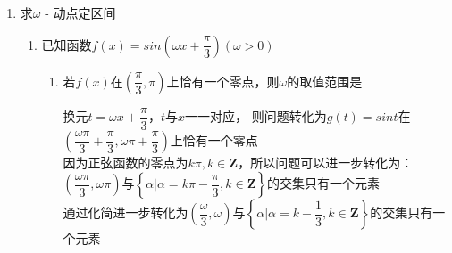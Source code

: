 \begin{enumerate}
\begin{enumerate}
\begin{jieda}
            当$k = 0$时，结合$\omega > 0$可得$\omega \in \left(0, \dfrac{\pi}{12}\right]$，当$k \neq 0$时解集为$\varnothing$，因此$\omega \in \left(0, \dfrac{\pi}{12}\right]$
        \end{jieda}
    \item 已知函数$y = cos\left(\omega x + \dfrac{\pi}{3}\right)$（$\omega > 0$）在区间$\left(-\dfrac{\pi}{6}, \dfrac{\pi}{3}\right)$上单调递减，则$\omega$的取值范围是\blkda{$\left(0, 2\right]$ }
    \begin{jieda}
        $\left(-\dfrac{\omega\pi}{6}+\dfrac{\pi}{3}, \dfrac{\omega\pi}{3}+\dfrac{\pi}{3}\right) \subset \left[2k\pi, 2k\pi+\pi\right], k\in \mathbf{Z}$，故$\omega \leq 2$
    \end{jieda}
    \item 已知函数 $f\left( x\right)  = \sin \left( {{\omega x} - \dfrac{\pi }{6}}\right) \left( {\omega  > 0}\right)$ 在 $\left\lbrack  {\dfrac{\pi }{3},\pi }\right\rbrack$ 上单调递增,则实数 $\omega$ 的取值范围是\blkda{$\left(0, \dfrac{2}{3}\right]$}

\end{enumerate}
\item 求$\omega$ - 动点定区间
\begin{enumerate}
    \item 已知函数$f(x) = sin\left(\omega x + \dfrac{\pi}{3}\right) (\omega > 0)$
    \begin{enumerate}
        \item 若$f(x)$在$\left(\dfrac{\pi}{3}, \pi\right)$上恰有一个零点，则$\omega$的取值范围是\blkda[3]{$\left(\dfrac{2}{3}, \dfrac{5}{3}\right] \cup \left[2, \dfrac{8}{3}\right]$}
        \begin{jieda}
            换元$t = \omega x + \dfrac{\pi}{3}$，$t$与$x$一一对应，
            则问题转化为$g(t) = sint$在$\left(\dfrac{\omega \pi}{3} + \dfrac{\pi}{3}, \omega \pi + \dfrac{\pi}{3} \right)$上恰有一个零点 \\
            
            因为正弦函数的零点为$k\pi, k \in \mathbf{Z}$，所以问题可以进一步转化为：\\
            $\left(\dfrac{\omega \pi}{3}, \omega \pi\right)$与$\left\{\alpha | \alpha = k\pi - \dfrac{\pi}{3}, k \in \mathbf{Z}\right\}$的交集只有一个元素 \\

            通过化简进一步转化为$\left(\dfrac{\omega}{3}, \omega\right)$与$\left\{\alpha | \alpha = k - \dfrac{1}{3}, k \in \mathbf{Z}\right\}$的交集只有一个元素
            

\end{jieda}
\end{enumerate}
\end{enumerate}
\end{enumerate}

